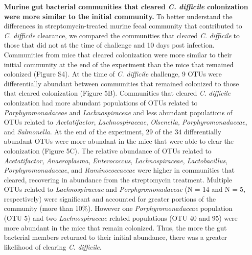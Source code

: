 \documentclass[
  12pt,
]{article}
\begin{document}
\textbf{Murine gut bacterial communities that cleared \emph{C.
difficile} colonization were more similar to the initial community.} To
better understand the differences in streptomycin-treated murine fecal
community that contributed to \emph{C. difficile} clearance, we compared
the communities that cleared \emph{C. difficile} to those that did not
at the time of challenge and 10 days post infection. Communities from
mice that cleared colonization were more similar to their initial
community at the end of the experiment than the mice that remained
colonized (Figure S4). At the time of \emph{C. difficile} challenge, 9
OTUs were differentially abundant between communities that remained
colonized to those that cleared colonization (Figure 5B). Communities
that cleared \emph{C. difficile} colonization had more abundant
populations of OTUs related to \emph{Porphyromonadaceae} and
\emph{Lachnospiraceae} and less abundant populations of OTUs related to
\emph{Acetatifactor}, \emph{Lachnospiraceae}, \emph{Olsenella},
\emph{Porphyromonadaceae}, and \emph{Salmonella}. At the end of the
experiment, 29 of the 34 differentially abundant OTUs were more abundant
in the mice that were able to clear the colonization (Figure 5C). The
relative abundance of OTUs related to \emph{Acetatifactor},
\emph{Anaeroplasma}, \emph{Enterococcus}, \emph{Lachnospiraceae},
\emph{Lactobacillus}, \emph{Porphyromonadaceae}, and
\emph{Ruminococcaceae} were higher in communities that cleared,
recovering in abundance from the streptomycin treatment. Multiple OTUs
related to \emph{Lachnospiraceae} and \emph{Porphyromonadaceae} (N = 14
and N = 5, respectively) were significant and accounted for greater
portions of the community (more than 10\%). However one
\emph{Porphyromonadaceae} population (OTU 5) and two
\emph{Lachnospiraceae} related populations (OTU 40 and 95) were more
abundant in the mice that remain colonized. Thus, the more the gut
bacterial members returned to their initial abundance, there was a
greater likelihood of clearing \emph{C. difficile}.
\end{document}
